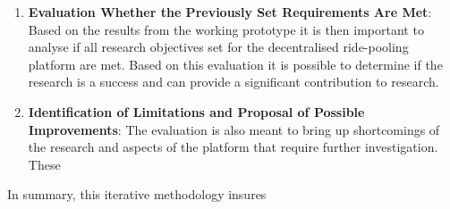 \begin{enumerate}
    \item \textbf{Evaluation Whether the Previously Set Requirements Are Met}: 
    Based on the results from the working prototype it is then important to analyse if all research objectives set for the decentralised ride-pooling platform are met. Based on this evaluation it is possible to determine if the research is a success and can provide a significant contribution to research.

    \item \textbf{Identification of Limitations and Proposal of Possible Improvements}:
    The evaluation is also meant to bring up shortcomings of the research and aspects of the platform that require further investigation. These 

\end{enumerate}

In summary, this iterative methodology insures 